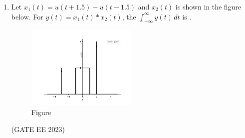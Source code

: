 \begin{enumerate}[label=\thechapter.\arabic*,ref=\thechapter.\theenumi]
\item Let $x_1(t) = u(t + 1.5) - u(t - 1.5)$ and $x_2(t)$ is shown in the figure below. For $y(t) = x_1(t) * x_2(t)$, the $\int_{-\infty}^{\infty} y(t) \, dt$ is \underline{\hspace{2cm}}.
\begin{figure}[htbp]
    \centering
    \includegraphics[width=0.5\textwidth]{2023/EC/58/figs/gatefig.png}
    \caption{Figure}
    \label{fig:graph}
\end{figure}

\hfill(GATE EE 2023) \\
\solution
\pagebreak
\end{enumerate}
